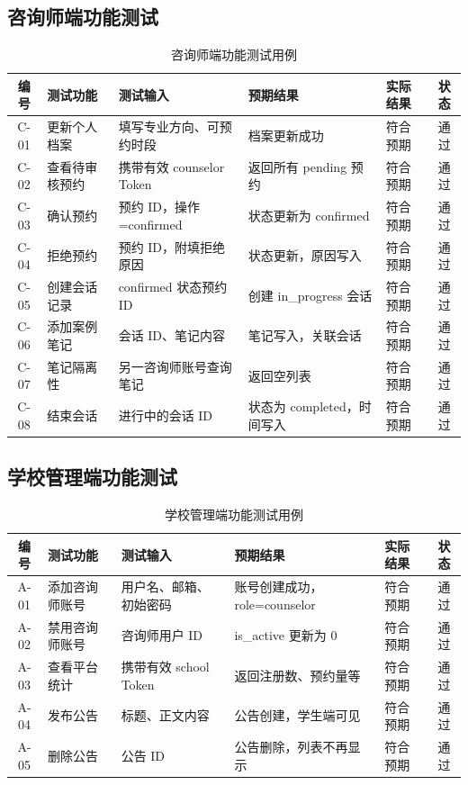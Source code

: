 \subsection{咨询师端功能测试}

\begin{table}[H]
    \centering
    \caption{咨询师端功能测试用例}
    \label{tab:5-3}
    \begin{tabularx}{\linewidth}{clXXXc}
        \toprule
        编号 & 测试功能 & 测试输入 & 预期结果 & 实际结果 & 状态 \\
        \midrule
        C-01 & 更新个人档案 & 填写专业方向、可预约时段 & 档案更新成功 & 符合预期 & 通过 \\
        C-02 & 查看待审核预约 & 携带有效 counselor Token & 返回所有 pending 预约 & 符合预期 & 通过 \\
        C-03 & 确认预约 & 预约 ID，操作=confirmed & 状态更新为 confirmed & 符合预期 & 通过 \\
        C-04 & 拒绝预约 & 预约 ID，附填拒绝原因 & 状态更新，原因写入 & 符合预期 & 通过 \\
        C-05 & 创建会话记录 & confirmed 状态预约 ID & 创建 in\_progress 会话 & 符合预期 & 通过 \\
        C-06 & 添加案例笔记 & 会话 ID、笔记内容 & 笔记写入，关联会话 & 符合预期 & 通过 \\
        C-07 & 笔记隔离性 & 另一咨询师账号查询笔记 & 返回空列表 & 符合预期 & 通过 \\
        C-08 & 结束会话 & 进行中的会话 ID & 状态为 completed，时间写入 & 符合预期 & 通过 \\
        \bottomrule
    \end{tabularx}
\end{table}

\subsection{学校管理端功能测试}

\begin{table}[H]
    \centering
    \caption{学校管理端功能测试用例}
    \label{tab:5-4}
    \begin{tabularx}{\linewidth}{clXXXc}
        \toprule
        编号 & 测试功能 & 测试输入 & 预期结果 & 实际结果 & 状态 \\
        \midrule
        A-01 & 添加咨询师账号 & 用户名、邮箱、初始密码 & 账号创建成功，role=counselor & 符合预期 & 通过 \\
        A-02 & 禁用咨询师账号 & 咨询师用户 ID & is\_active 更新为 0 & 符合预期 & 通过 \\
        A-03 & 查看平台统计 & 携带有效 school Token & 返回注册数、预约量等 & 符合预期 & 通过 \\
        A-04 & 发布公告 & 标题、正文内容 & 公告创建，学生端可见 & 符合预期 & 通过 \\
        A-05 & 删除公告 & 公告 ID & 公告删除，列表不再显示 & 符合预期 & 通过 \\
        \bottomrule
    \end{tabularx}
\end{table}

